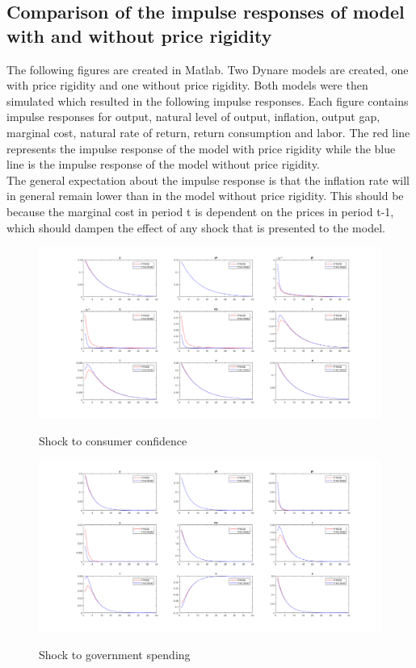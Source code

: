 \documentclass[10pt,a4paper]{article}
\begin{document}
\subsection{Comparison of the impulse responses of model with and without price rigidity}
The following figures are created in Matlab. Two Dynare models are created, one with price rigidity and one without price rigidity. Both models were then simulated which resulted in the following impulse responses. Each figure contains impulse responses for output, natural level of output, inflation, output gap, marginal cost, natural rate of return, return consumption and labor. The red line represents the impulse response of the model with price rigidity while the blue line is the impulse response of the model without price rigidity. \\
The general expectation about the impulse response is that the inflation rate will in general remain lower than in the model without price rigidity. This should be because the marginal cost in period t is dependent on the prices in period t-1, which should dampen the effect of any shock that is presented to the model. \\
\begin{figure}[H]
	\centering
    \includegraphics[scale=0.35]{./screenshots/shock_to_consumer_confidence.png}
    \label{Figure 1:}
    \caption{Shock to consumer confidence}
\end{figure}
\begin{figure}[H]
	\centering
   \includegraphics[scale=0.35]{./screenshots/shock_to_government_spending.png}
   \label{Figure 2:}
   \caption{Shock to government spending}
\end{figure}
\end{document}
